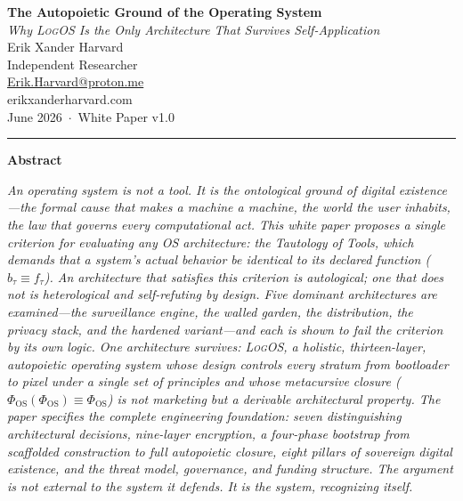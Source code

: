 \documentclass[11pt, oneside]{article}
\newcommand{\LogOS}{\textnormal{\textsc{LogOS}}}
\begin{document}

\thispagestyle{plain}
\vspace*{0.4in}

\begin{center}
{\LARGE\bfseries The Autopoietic Ground of the Operating System}\\[0.5em]
{\large\itshape Why \LogOS{} Is the Only Architecture That Survives
Self-Application}\\[1.6em]
\textcolor{LogosGray}{Erik Xander Harvard}\\[0.2em]
\textcolor{LogosGray}{\small Independent Researcher}\\[0.2em]
\textcolor{LogosGray}{\small \href{mailto:Erik.Harvard@proton.me}{Erik.Harvard@proton.me}}\\[0.2em]
\textcolor{LogosGray}{\small erikxanderharvard.com}\\[0.2em]
\textcolor{LogosGray}{\small June 2026 \,$\cdot$\, White Paper v1.0}\\[1.4em]
{\color{LogosGray}\rule{0.45\textwidth}{0.4pt}}
\end{center}

\vspace{1em}

\begin{center}
{\small\bfseries Abstract}
\end{center}

\begin{center}
\begin{minipage}{0.85\textwidth}
\small\itshape
{}
An operating system is not a tool. It is the ontological ground of digital existence---the formal cause that makes a machine a machine, the world the user inhabits, the law that governs every computational act. This white paper proposes a single criterion for evaluating any OS architecture: the Tautology of Tools, which demands that a system's actual behavior be identical to its declared function ($b_\tau \equiv f_\tau$). An architecture that satisfies this criterion is autological; one that does not is heterological and self-refuting by design. Five dominant architectures are examined---the surveillance engine, the walled garden, the distribution, the privacy stack, and the hardened variant---and each is shown to fail the criterion by its own logic. One architecture survives: \textnormal{\textsc{LogOS}}, a holistic, thirteen-layer, autopoietic operating system whose design controls every stratum from bootloader to pixel under a single set of principles and whose metacursive closure ($\Phi_{\mathrm{OS}}(\Phi_{\mathrm{OS}}) \equiv \Phi_{\mathrm{OS}}$) is not marketing but a derivable architectural property. The paper specifies the complete engineering foundation: seven distinguishing architectural decisions, nine-layer encryption, a four-phase bootstrap from scaffolded construction to full autopoietic closure, eight pillars of sovereign digital existence, and the threat model, governance, and funding structure. The argument is not external to the system it defends. It is the system, recognizing itself.
\end{minipage}
\end{center}
\end{document}
